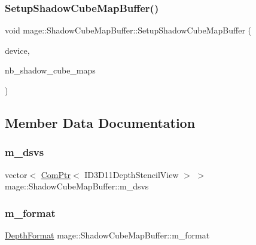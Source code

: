 \subsubsection{\texorpdfstring{Setup\+Shadow\+Cube\+Map\+Buffer()}{SetupShadowCubeMapBuffer()}}
{\footnotesize\ttfamily void mage\+::\+Shadow\+Cube\+Map\+Buffer\+::\+Setup\+Shadow\+Cube\+Map\+Buffer (\begin{DoxyParamCaption}\item[{I\+D3\+D11\+Device2 $\ast$}]{device,  }\item[{size\+\_\+t}]{nb\+\_\+shadow\+\_\+cube\+\_\+maps }\end{DoxyParamCaption})\hspace{0.3cm}{\ttfamily [private]}}



\subsection{Member Data Documentation}
\hypertarget{structmage_1_1_shadow_cube_map_buffer_aa0db6bec24d63c39c85400c4328190fc}{}\label{structmage_1_1_shadow_cube_map_buffer_aa0db6bec24d63c39c85400c4328190fc} 
\subsubsection{\texorpdfstring{m\+\_\+dsvs}{m\_dsvs}}
{\footnotesize\ttfamily vector$<$ \hyperlink{namespacemage_ae74f374780900893caa5555d1031fd79}{Com\+Ptr}$<$ I\+D3\+D11\+Depth\+Stencil\+View $>$ $>$ mage\+::\+Shadow\+Cube\+Map\+Buffer\+::m\+\_\+dsvs\hspace{0.3cm}{\ttfamily [private]}}

\hypertarget{structmage_1_1_shadow_cube_map_buffer_ada9a7c895a74303904f9884b986c935f}{}\label{structmage_1_1_shadow_cube_map_buffer_ada9a7c895a74303904f9884b986c935f} 
\subsubsection{\texorpdfstring{m\+\_\+format}{m\_format}}
{\footnotesize\ttfamily \hyperlink{namespacemage_aed4c3f883a30484d0a20762c06be81d4}{Depth\+Format} mage\+::\+Shadow\+Cube\+Map\+Buffer\+::m\+\_\+format\hspace{0.3cm}{\ttfamily [private]}}

